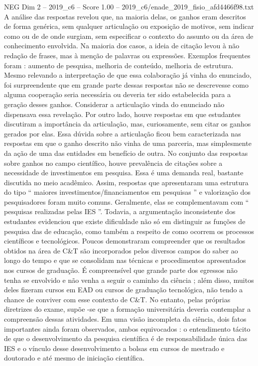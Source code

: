 \begin{textsample}{NEG Dim 2 – 2019\_c6 – Score 1.00 – 2019\_c6/enade\_2019\_fisio\_afd4466f98.txt}
A análise das respostas revelou que, na maioria delas, os ganhos eram descritos de forma genérica, sem qualquer articulação ou exposição de motivos, sem indicar como ou de de onde surgiam, sem especificar o contexto do assunto ou da área de conhecimento envolvida.
Na maioria dos casos, a ideia de citação levou à não redação de frases, mas à menção de palavras ou expressões.
Exemplos frequentes foram : aumento de pesquisa, melhoria de conteúdo, melhoria de estrutura.
Mesmo relevando a interpretação de que essa colaboração já vinha do enunciado, foi surpreendente que em grande parte dessas respostas não se descrevesse como alguma cooperação seria necessária ou deveria ter sido estabelecida para a geração desses ganhos.
Considerar a articulação vinda do enunciado não dispensava essa revelação.
Por outro lado, houve respostas em que estudantes discutiram a importância da articulação, mas, curiosamente, sem citar os ganhos gerados por elas.
Essa dúvida sobre a articulação ficou bem caracterizada nas respostas em que o ganho descrito não vinha de uma parceria, mas simplesmente da ação de uma das entidades em benefício de outra.
No conjunto das respostas sobre ganhos no campo científico, houve prevalência de citações sobre a necessidade de investimentos em pesquisa.
Essa é uma demanda real, bastante discutida no meio acadêmico.
Assim, respostas que apresentaram uma estrutura do tipo “ maiores investimentos/financiamentos em pesquisas ” e valorização dos pesquisadores foram muito comuns.
Geralmente, elas se complementavam com “ pesquisas realizadas pelas IES ”.
Todavia, a argumentação inconsistente dos estudantes evidenciou que existe dificuldade não só em distinguir as funções de pesquisa das de educação, como também a respeito de como ocorrem os processos científicos e tecnológicos.
Poucos demonstraram compreender que os resultados obtidos na área de C\&T são incorporados pelos diversos campos do saber ao longo do tempo e que se consolidam nas técnicas e procedimentos apresentados nos cursos de graduação.
É compreensível que grande parte dos egressos não tenha se envolvido e não venha a seguir o caminho da ciência ; além disso, muitos deles fizeram cursos em EAD ou cursos de graduação tecnológica, não tendo a chance de conviver com esse contexto de C\&T.
No entanto, pelas próprias diretrizes do exame, supõe -se que a formação universitária deveria contemplar a compreensão dessas atividades.
Em uma visão incompleta da ciência, dois fatos importantes ainda foram observados, ambos equivocados : o entendimento tácito de que o desenvolvimento da pesquisa científica é de responsabilidade única das IES e o vínculo desse desenvolvimento a bolsas em cursos de mestrado e doutorado e até mesmo de iniciação científica.

\end{textsample}
